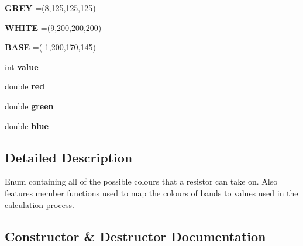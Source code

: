 \begin{DoxyCompactItemize}
{\bfseries G\+R\+EY} =(8,125,125,125)
\item 
\hypertarget{enumohm_1_1_value_identification_1_1_resistor_colour_a911b7f46c5c9b1c8ddcc69c2d057c7ed}{}\label{enumohm_1_1_value_identification_1_1_resistor_colour_a911b7f46c5c9b1c8ddcc69c2d057c7ed} 
{\bfseries W\+H\+I\+TE} =(9,200,200,200)
\item 
\hypertarget{enumohm_1_1_value_identification_1_1_resistor_colour_a1607634a487f8ccbb4b959dafb71cf38}{}\label{enumohm_1_1_value_identification_1_1_resistor_colour_a1607634a487f8ccbb4b959dafb71cf38} 
{\bfseries B\+A\+SE} =(-\/1,200,170,145)
\item 
\hypertarget{enumohm_1_1_value_identification_1_1_resistor_colour_ad88e5863801d32c19781de2aeb07f253}{}\label{enumohm_1_1_value_identification_1_1_resistor_colour_ad88e5863801d32c19781de2aeb07f253} 
int {\bfseries value}
\item 
\hypertarget{enumohm_1_1_value_identification_1_1_resistor_colour_a0a8a9371e9b6b628ff622322fecdd23c}{}\label{enumohm_1_1_value_identification_1_1_resistor_colour_a0a8a9371e9b6b628ff622322fecdd23c} 
double {\bfseries red}
\item 
\hypertarget{enumohm_1_1_value_identification_1_1_resistor_colour_ace66ead34406de3a9f477388a54838dd}{}\label{enumohm_1_1_value_identification_1_1_resistor_colour_ace66ead34406de3a9f477388a54838dd} 
double {\bfseries green}
\item 
\hypertarget{enumohm_1_1_value_identification_1_1_resistor_colour_aa17e049a9f69abe5536da147064ce0a2}{}\label{enumohm_1_1_value_identification_1_1_resistor_colour_aa17e049a9f69abe5536da147064ce0a2} 
double {\bfseries blue}
\end{DoxyCompactItemize}


\subsection{Detailed Description}
Enum containing all of the possible colours that a resistor can take on. Also features member functions used to map the colours of bands to values used in the calculation process. 

\subsection{Constructor \& Destructor Documentation}
\hypertarget{enumohm_1_1_value_identification_1_1_resistor_colour_a55d151fdd193107e23c51646774744a8}{}\label{enumohm_1_1_value_identification_1_1_resistor_colour_a55d151fdd193107e23c51646774744a8} 
